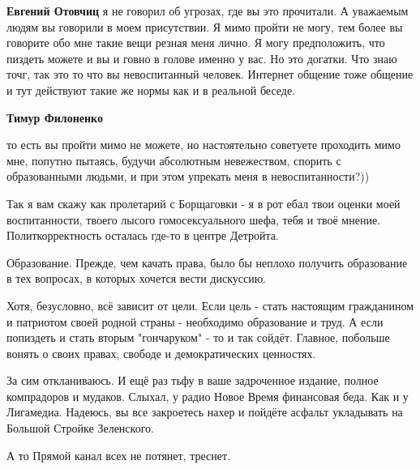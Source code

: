 \begin{itemize}
\begin{itemize}
\textbf{Евгений Отовчиц} я не говорил об угрозах, где вы это прочитали. А уважаемым людям вы говорили в моем присутствии. Я мимо пройти не могу, тем более вы говорите обо мне такие вещи резная меня лично. Я могу предположить, что пиздеть можете и вы и говно в голове именно у вас. Но это догатки. Что знаю точг, так это то что вы невоспитанный человек. Интернет общение тоже общение и тут действуют такие же нормы как и в реальной беседе.

\textbf{Тимур Филоненко} 

то есть вы пройти мимо не можете, но настоятельно советуете проходить мимо мне,
попутно пытаясь, будучи абсолютным невежеством, спорить с образованными людьми,
и при этом упрекать меня в невоспитанности?))

Так я вам скажу как пролетарий с Борщаговки - я в рот ебал твои оценки моей
воспитанности, твоего лысого гомосексуального шефа, тебя и твоё мнение.
Политкорректность осталась где-то в центре Детройта.

Образование. Прежде, чем качать права, было бы неплохо получить образование в
тех вопросах, в которых хочется вести дискуссию.

Хотя, безусловно, всё зависит от цели. Если цель - стать настоящим гражданином
и патриотом своей родной страны - необходимо образование и труд. А если
попиздеть и стать вторым "гончаруком" - то и так сойдёт. Главное, побольше
вонять о своих правах, свободе и демократических ценностях.

За сим откланиваюсь. И ещё раз тьфу в ваше задроченное издание, полное
компрадоров и мудаков. Слыхал, у радио Новое Время финансовая беда. Как и у
Лигамедиа. Надеюсь, вы все закроетесь нахер и пойдёте асфальт укладывать на
Большой Стройке Зеленского.

А то Прямой канал всех не потянет, треснет.

\end{itemize} %

\end{itemize} %
